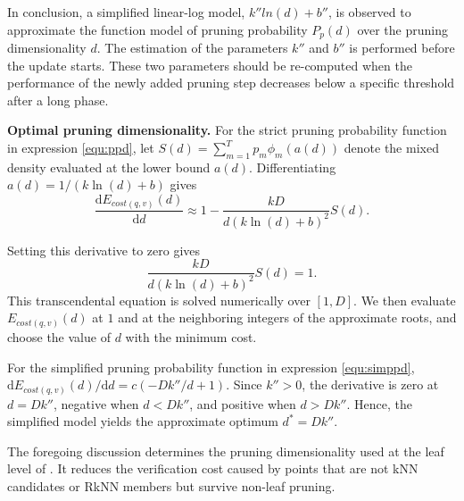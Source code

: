 In conclusion, a simplified linear-log model, $k''ln(d)+b''$, is observed to approximate the function model of pruning probability $P_p(d)$ over the pruning dimensionality $d$. The estimation of the parameters $k''$ and $b''$ is performed before the update starts. These two parameters should be re-computed when the performance of the newly added pruning step decreases below a specific threshold after a long phase.



\noindent\textbf{Optimal pruning dimensionality.}
For the strict pruning probability function in expression \ref{equ:ppd}, let $S(d)=\sum^{T}_{m=1}p_m\phi_m(a(d))$ denote the mixed density evaluated at the lower bound $a(d)$. Differentiating $a(d)=1/(k\ln(d)+b)$ gives
\begin{equation}
\frac{\mathrm{d}E_{cost(q,v)}(d)}{\mathrm{d}d}
\approx 1-\frac{kD}{d(k\ln(d)+b)^2}S(d).
\end{equation}

Setting this derivative to zero gives
\begin{equation}
\frac{kD}{d(k\ln(d)+b)^2}S(d)=1 .
\end{equation}
This transcendental equation is solved numerically over $[1,D]$. We then evaluate $E_{cost(q,v)}(d)$ at $1$ and at the neighboring integers of the approximate roots, and choose the value of $d$ with the minimum cost. 

For the simplified pruning probability function in expression \ref{equ:simppd}, $\mathrm{d}E_{cost(q,v)}(d)/\mathrm{d}d=c(-Dk''/d+1)$. Since $k''>0$, the derivative is zero at $d=Dk''$, negative when $d<Dk''$, and positive when $d>Dk''$. Hence, the simplified model yields the approximate optimum $d^*=Dk''$.

The foregoing discussion determines the pruning dimensionality used at the leaf level of \dualtree. It reduces the verification cost caused by points that are not kNN candidates or RkNN members but survive non-leaf pruning. 

























